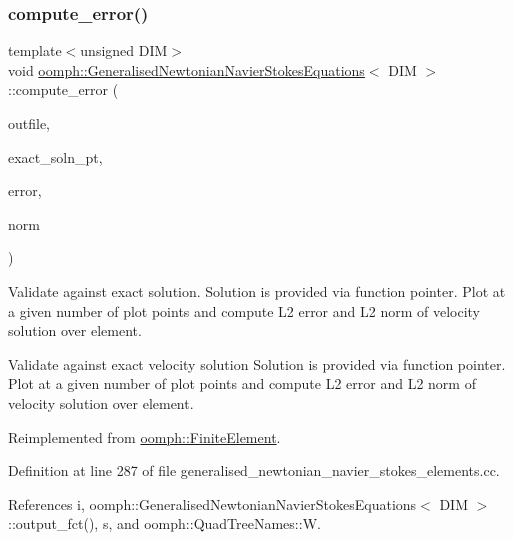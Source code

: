 \subsubsection{\texorpdfstring{compute\+\_\+error()}{compute\_error()}\hspace{0.1cm}{\footnotesize\ttfamily [2/2]}}
{\footnotesize\ttfamily template$<$unsigned D\+IM$>$ \\
void \hyperlink{classoomph_1_1GeneralisedNewtonianNavierStokesEquations}{oomph\+::\+Generalised\+Newtonian\+Navier\+Stokes\+Equations}$<$ D\+IM $>$\+::compute\+\_\+error (\begin{DoxyParamCaption}\item[{std\+::ostream \&}]{outfile,  }\item[{\hyperlink{classoomph_1_1FiniteElement_a690fd33af26cc3e84f39bba6d5a85202}{Finite\+Element\+::\+Steady\+Exact\+Solution\+Fct\+Pt}}]{exact\+\_\+soln\+\_\+pt,  }\item[{double \&}]{error,  }\item[{double \&}]{norm }\end{DoxyParamCaption})\hspace{0.3cm}{\ttfamily [virtual]}}



Validate against exact solution. Solution is provided via function pointer. Plot at a given number of plot points and compute L2 error and L2 norm of velocity solution over element. 

Validate against exact velocity solution Solution is provided via function pointer. Plot at a given number of plot points and compute L2 error and L2 norm of velocity solution over element. 

Reimplemented from \hyperlink{classoomph_1_1FiniteElement_a73c79a1f1e5b1d334757812a6bbd58ff}{oomph\+::\+Finite\+Element}.



Definition at line 287 of file generalised\+\_\+newtonian\+\_\+navier\+\_\+stokes\+\_\+elements.\+cc.



References i, oomph\+::\+Generalised\+Newtonian\+Navier\+Stokes\+Equations$<$ D\+I\+M $>$\+::output\+\_\+fct(), s, and oomph\+::\+Quad\+Tree\+Names\+::W.

\mbox{\label{classoomph_1_1GeneralisedNewtonianNavierStokesEquations_a4b894ab704ed76af34948e17045e0a2a}} 
